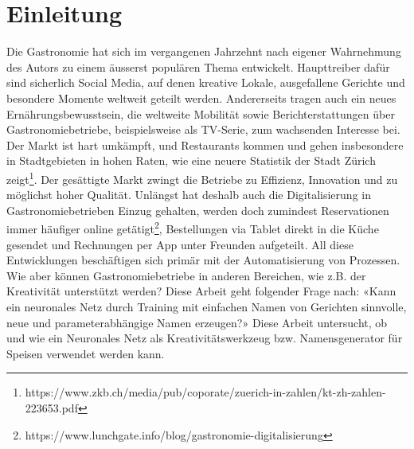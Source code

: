 \chapter{Einleitung}
\label{ch:introduction}

Die Gastronomie hat sich im vergangenen Jahrzehnt nach eigener Wahrnehmung des Autors zu einem äusserst populären Thema entwickelt.
Haupttreiber dafür sind sicherlich Social Media, auf denen kreative Lokale, ausgefallene Gerichte und besondere Momente weltweit geteilt werden.
Andererseits tragen auch ein neues Ernährungsbewusstsein, die weltweite Mobilität sowie Berichterstattungen über Gastronomiebetriebe, beispielsweise als TV-Serie, zum wachsenden Interesse bei.
Der Markt ist hart umkämpft, und Restaurants kommen und gehen insbesondere in Stadtgebieten in hohen Raten, wie eine neuere Statistik der Stadt Zürich zeigt\footnote{https://www.zkb.ch/media/pub/coporate/zuerich-in-zahlen/kt-zh-zahlen-223653.pdf}.
Der gesättigte Markt zwingt die Betriebe zu Effizienz, Innovation und zu möglichst hoher Qualität.
Unlängst hat deshalb auch die Digitalisierung in Gastronomiebetrieben Einzug gehalten, werden doch zumindest Reservationen immer häufiger online getätigt\footnote{https://www.lunchgate.info/blog/gastronomie-digitalisierung}, Bestellungen via Tablet
direkt in die Küche gesendet und Rechnungen per App unter Freunden aufgeteilt.
All diese Entwicklungen beschäftigen sich primär mit der Automatisierung von Prozessen.
Wie aber können Gastronomiebetriebe in anderen Bereichen, wie z.B. der Kreativität unterstützt werden?
Diese Arbeit geht folgender Frage nach: «Kann ein neuronales Netz durch Training mit einfachen Namen von Gerichten sinnvolle, neue und parameterabhängige Namen erzeugen?»
Diese Arbeit untersucht, ob und wie ein Neuronales Netz als Kreativitätswerkzeug bzw. Namensgenerator für Speisen verwendet werden kann.
